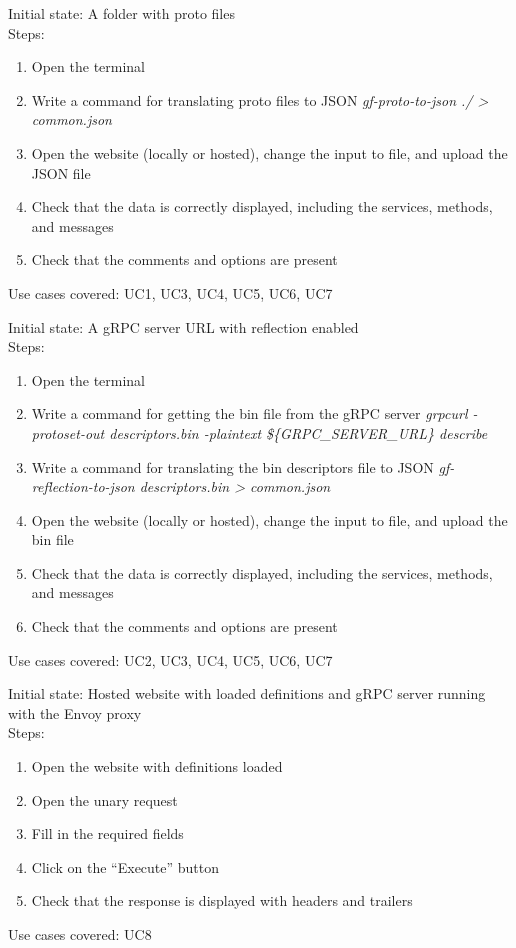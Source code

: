 Initial state: A folder with proto files\\
Steps:
\begin{enumerate}
    \item Open the terminal
    \item Write a command for translating proto files to JSON \textit{gf-proto-to-json ./ \textgreater{} common.json}
    \item Open the website (locally or hosted), change the input to file, and upload the JSON file
    \item Check that the data is correctly displayed, including the services, methods, and messages
    \item Check that the comments and options are present
\end{enumerate}
Use cases covered: UC1, UC3, UC4, UC5, UC6, UC7

Initial state: A gRPC server URL with reflection enabled\\
Steps:
\begin{enumerate}
    \item Open the terminal
    \item Write a command for getting the bin file from the gRPC server \textit{grpcurl -protoset-out descriptors.bin -plaintext \$\{GRPC\_SERVER\_URL\} describe}
    \item Write a command for translating the bin descriptors file to JSON \textit{gf-reflection-to-json descriptors.bin \textgreater{} common.json}
    \item Open the website (locally or hosted), change the input to file, and upload the bin file
    \item Check that the data is correctly displayed, including the services, methods, and messages
    \item Check that the comments and options are present
\end{enumerate}
Use cases covered: UC2, UC3, UC4, UC5, UC6, UC7

Initial state: Hosted website with loaded definitions and gRPC server running with the Envoy proxy\\
Steps:
\begin{enumerate}
    \item Open the website with definitions loaded
    \item Open the unary request
    \item Fill in the required fields
    \item Click on the \enquote{Execute} button
    \item Check that the response is displayed with headers and trailers
\end{enumerate}
Use cases covered: UC8


